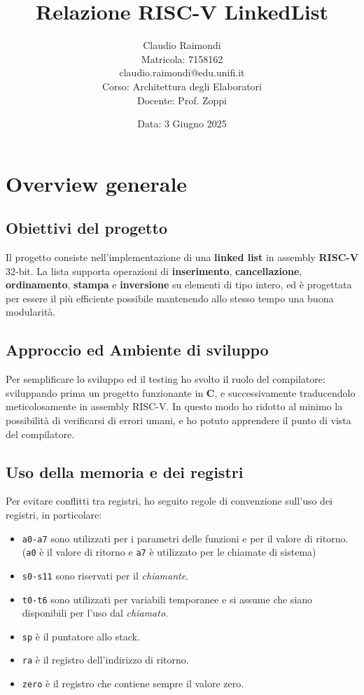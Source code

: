 \documentclass[a4paper,12pt]{article}
\title{\textbf{Relazione RISC-V LinkedList}}
\author{Claudio Raimondi\\Matricola: 7158162\\claudio.raimondi@edu.unifi.it\\
Corso: Architettura degli Elaboratori\\
Docente: Prof. Zoppi}
\date{Data: 3 Giugno 2025}
\begin{document}
\maketitle
\tableofcontents
\thispagestyle{empty}
\newpage
\setcounter{page}{1}

\section{Overview generale}

\subsection{Obiettivi del progetto}

Il progetto consiste nell'implementazione di una \textbf{linked list} in assembly \textbf{RISC-V} 32-bit. 
La lista supporta operazioni di \textbf{inserimento}, \textbf{cancellazione}, \textbf{ordinamento}, \textbf{stampa} e \textbf{inversione} su elementi di tipo intero, ed è progettata per essere il più efficiente possibile mantenendo allo stesso tempo una buona modularità.

\subsection{Approccio ed Ambiente di sviluppo}

Per semplificare lo sviluppo ed il testing ho svolto il ruolo del compilatore: sviluppando prima un progetto funzionante in \textbf{C}, e successivamente traducendolo meticolosamente in assembly RISC-V.
In questo modo ho ridotto al minimo la possibilità di verificarsi di errori umani, e ho potuto apprendere il punto di vista del compilatore.

\subsection{Uso della memoria e dei registri}

Per evitare conflitti tra registri, ho seguito regole di convenzione sull'uso dei registri, in particolare:
\begin{itemize}
  \item \texttt{a0-a7} sono utilizzati per i parametri delle funzioni e per il valore di ritorno. (\texttt{a0} è il valore di ritorno e \texttt{a7} è utilizzato per le chiamate di sistema)
  \item \texttt{s0-s11} sono riservati per il \emph{chiamante}.
  \item \texttt{t0-t6} sono utilizzati per variabili temporanee e si assume che siano disponibili per l'uso dal \emph{chiamato}.
  \item \texttt{sp} è il puntatore allo stack.
  \item \texttt{ra} è il registro dell'indirizzo di ritorno.
  \item \texttt{zero} è il registro che contiene sempre il valore zero.
\end{itemize}
\end{document}
